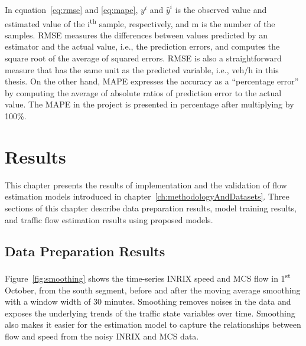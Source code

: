 \documentclass[english]{kththesis}
\begin{document}
In equation~\ref{eq:rmse} and \ref{eq:mape}, $y^i$ and $\hat{y}^i$ is the observed value and estimated value of the i\textsuperscript{th} sample, respectively, and m is the number of the samples. RMSE measures the differences between values predicted by an estimator and the actual value, i.e., the prediction errors, and computes the square root of the average of squared errors. RMSE is also a straightforward measure that has the same unit as the predicted variable, i.e., veh/h in this thesis. On the other hand, MAPE expresses the accuracy as a “percentage error” by computing the average of absolute ratios of prediction error to the actual value. The MAPE in the project is presented in percentage after multiplying by 100\%.

\chapter{Results}
\label{ch:results}
This chapter presents the results of implementation and the validation of flow estimation models introduced in chapter~\ref{ch:methodologyAndDatasets}. Three sections of this chapter describe data preparation results, model training results, and traffic flow estimation results using proposed models.

\section{Data Preparation Results}
\label{sec:resultsDataPreparation}
Figure~\ref{fig:smoothing} shows the time-series INRIX speed and MCS flow in 1\textsuperscript{st} October, from the south segment, before and after the moving average smoothing with a window width of 30 minutes. Smoothing removes noises in the data and exposes the underlying trends of the traffic state variables over time. Smoothing also makes it easier for the estimation model to capture the relationships between flow and speed from the noisy INRIX and MCS data.
\end{document}
